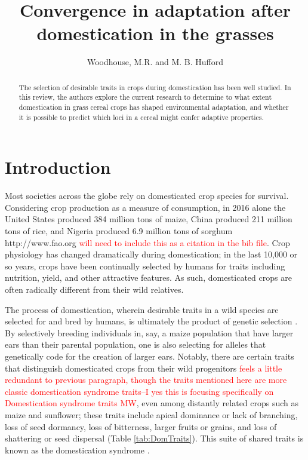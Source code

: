 \documentclass[12pt]{article}
\title{Convergence in adaptation after domestication in the grasses}
\author{Woodhouse, M.R. and M. B. Hufford}
\newcommand{\mbh}[1]{\textcolor{red}{\normalsize  #1}}
\begin{document}
\maketitle

\begin{abstract}
The selection of desirable traits in crops during domestication has been well studied. In this review, the authors explore the current research to determine to what extent domestication in grass cereal crops has shaped environmental adaptation, and whether it is possible to predict which loci in a cereal might confer adaptive properties.
\end{abstract}

\section*{Introduction}
Most societies across the globe rely on domesticated crop species for survival.
Considering crop production as a measure of consumption, in 2016 alone the United States produced 384 million tons of maize, China produced 211 million tons of rice, and Nigeria produced 6.9 million tons of sorghum http://www.fao.org \mbh{will need to include this as a citation in the bib file}.
Crop physiology has changed dramatically during domestication; in the last 10,000 or so years, crops have been continually selected by humans for traits including nutrition, yield, and other attractive features.
As such, domesticated crops are often radically different from their wild relatives.

The process of domestication, wherein desirable traits in a wild species are selected for and bred by humans, is ultimately the product of genetic selection \citep{Doebley2006}.
By selectively breeding individuals in, say, a maize population that have larger ears than their parental population, one is also selecting for alleles that genetically code for the creation of larger ears. 
Notably, there are certain traits that distinguish domesticated crops from their wild progenitors \mbh{feels a little redundant to previous paragraph, though the traits mentioned here are more classic domestication syndrome traits--I yes this is focusing specifically on Domestication syndrome traits MW}, even among distantly related crops such as maize and sunflower; these traits include apical dominance or lack of branching, loss of seed dormancy, loss of bitterness, larger fruits or grains, and loss of shattering or seed dispersal (Table \ref{tab:DomTraits}).
This suite of shared traits is known as the domestication syndrome \citep{Hammer1984}.
\end{document}
